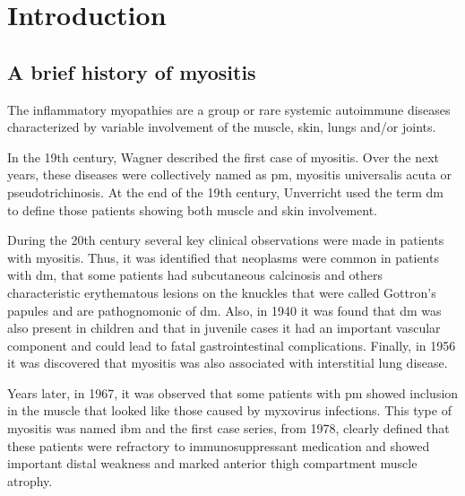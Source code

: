 \chapter{Introduction}

\section{A brief history of myositis}

The inflammatory myopathies are a group or rare systemic autoimmune diseases characterized by variable involvement of the muscle, skin, lungs and/or joints.\cite{SelvaOCallaghan2018}

In the 19th century, Wagner described the first case of myositis.\cite{Wagner1863} Over the next years, these diseases were collectively named as \gls{pm}, myositis universalis acuta or pseudotrichinosis.\cite{Pottain1875,Hepp1887,Unverricht1887,Stertz1916,Kankeleit1916,Patjes1926,Hautveränderungen1930} At the end of the 19th century, Unverricht used the term \gls{dm} to define those patients showing both muscle and skin involvement.\cite{Unverricht1891}

During the 20th century several key clinical observations were made in patients with myositis. Thus, it was identified that neoplasms were common in patients with \gls{dm}, that some patients had subcutaneous calcinosis and others characteristic erythematous lesions on the knuckles that were called Gottron’s papules and are pathognomonic of \gls{dm}.\cite{Stertz1916,Kankeleit1916,Patjes1926,Hautveränderungen1930} Also, in 1940 it was found that \gls{dm} was also present in children and that in juvenile cases it had an important vascular component and could lead to fatal gastrointestinal complications.\cite{Hecht1940} Finally, in 1956 it was discovered that myositis was also associated with interstitial lung disease.\cite{Mills1956}

Years later, in 1967, it was observed that some patients with \gls{pm} showed inclusion in the muscle that looked like those caused by myxovirus infections.\cite{Chou1967} This type of myositis was named \gls{ibm} and the first case series, from 1978, clearly defined that these patients were refractory to immunosuppressant medication and showed important distal weakness and marked anterior thigh compartment muscle atrophy.\cite{Carpenter1978}

